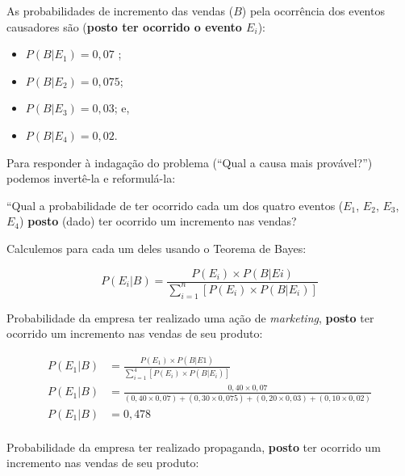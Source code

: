 \documentclass[
]{book}
\providecommand{\tightlist}{%
  \setlength{\itemsep}{0pt}\setlength{\parskip}{0pt}}
\begin{document}
\hfill\break

As probabilidades de incremento das vendas (\(B\)) pela ocorrência dos eventos causadores são (\textbf{posto ter ocorrido o evento \(E_{i}\)}):

\hfill\break

\begin{itemize}
\tightlist
\item
  \(P(B|E_{1}) = 0,07\) ;
\item
  \(P(B|E_{2}) = 0,075\);\\
\item
  \(P(B|E_{3}) = 0,03\); e,\\
\item
  \(P(B|E_{4}) = 0,02\).
\end{itemize}

\hfill\break

Para responder à indagação do problema (``Qual a causa mais provável?'') podemos invertê-la e reformulá-la:

\hfill\break

``Qual a probabilidade de ter ocorrido cada um dos quatro eventos (\(E_{1}\), \(E_{2}\), \(E_{3}\), \(E_{4}\)) \textbf{posto} (dado) ter ocorrido um incremento nas vendas?

\hfill\break

Calculemos para cada um deles usando o Teorema de Bayes:

\hfill\break

\[
P(E_{i}|B) = \frac{ P(E_{i}) \times P(B|E{i})   }{  \sum _{i=1}^{n}\left[P\left({E}_{i}\right)\times P\left(B|{E}_{i}\right)\right]  }
\]

\hfill\break

Probabilidade da empresa ter realizado uma ação de \emph{marketing}, \textbf{posto} ter ocorrido um incremento nas vendas de seu produto:

\hfill\break

\begin{align*}
P(E_{1}|B) &  = \frac{ P(E_{1}) \times P(B|E{1})   }{  \sum _{i=1}^{4}\left[P\left({E}_{i}\right)\times P\left(B|{E}_{i}\right)\right] } \\
P(E_{1}|B) & = \frac{0,40 \times 0,07} { (0,40 \times 0,07) + (0,30 \times 0,075) +(0,20 \times 0,03) +(0,10 \times 0,02) } \\
P(E_{1}|B) & = 0,478 \\
\end{align*}

\hfill\break

Probabilidade da empresa ter realizado propaganda, \textbf{posto} ter ocorrido um incremento nas vendas de seu produto:
\end{document}
